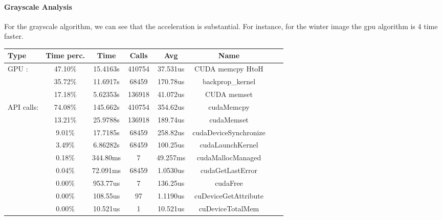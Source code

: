 \documentclass[11pt]{article}
\begin{document}
\paragraph*{Grayscale Analysis}
For the grayscale algorithm, we can see that the acceleration is substantial. For instance, for the winter image the gpu algorithm is 4 time faster.

\begin{table}[h]\centering
	\begin{tabular}{|l|c|c|c|c|c|c|c|}
		\hline
		\textbf{Type} & \textbf{Time perc.} & \textbf{Time} & \textbf{Calls} & \textbf{Avg} & \textbf{Name}         \\ \hline
		GPU :         & 47.10\%             & 15.4163s      & 410754         & 37.531us     & CUDA memcpy HtoH      \\ \hline
		              & 35.72\%             & 11.6917s      & 68459          & 170.78us     & backprop\_kernel      \\ \hline
		              & 17.18\%             & 5.62353s      & 136918         & 41.072us     & CUDA memset           \\ \hline
		API calls:    & 74.08\%             & 145.662s      & 410754         & 354.62us     & cudaMemcpy            \\ \hline
		              & 13.21\%             & 25.9788s      & 136918         & 189.74us     & cudaMemset            \\ \hline
		              & 9.01\%              & 17.7185s      & 68459          & 258.82us     & cudaDeviceSynchronize \\ \hline
		              & 3.49\%              & 6.86282s      & 68459          & 100.25us     & cudaLaunchKernel      \\ \hline
		              & 0.18\%              & 344.80ms      & 7              & 49.257ms     & cudaMallocManaged     \\ \hline
		              & 0.04\%              & 72.091ms      & 68459          & 1.0530us     & cudaGetLastError      \\ \hline
		              & 0.00\%              & 953.77us      & 7              & 136.25us     & cudaFree              \\ \hline
		              & 0.00\%              & 108.55us      & 97             & 1.1190us     & cuDeviceGetAttribute  \\ \hline
		              & 0.00\%              & 10.521us      & 1              & 10.521us     & cuDeviceTotalMem      \\ \hline

\end{tabular}
\end{table}
\end{document}
